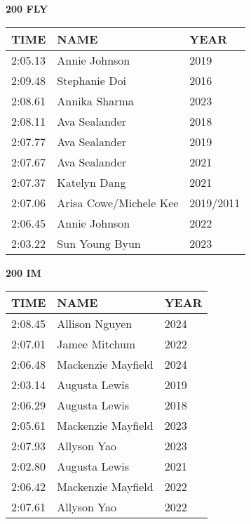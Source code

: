 \begin{minipage}[t]{0.48\textwidth}
\centering
\textbf{200 FLY}\\[0.05cm]
\begin{tabular}{@{}p{1.8cm}p{2.8cm}p{1.2cm}@{}}
\hline
\textbf{TIME} & \textbf{NAME} & \textbf{YEAR} \\
\hline
2:05.13 & Annie Johnson & 2019 \\
2:09.48 & Stephanie Doi & 2016 \\
2:08.61 & Annika Sharma & 2023 \\
2:08.11 & Ava Sealander & 2018 \\
2:07.77 & Ava Sealander & 2019 \\
2:07.67 & Ava Sealander & 2021 \\
2:07.37 & Katelyn Dang & 2021 \\
2:07.06 & Arisa Cowe/Michele Kee & 2019/2011 \\
2:06.45 & Annie Johnson & 2022 \\
2:03.22 & Sun Young Byun & 2023 \\
\hline
\end{tabular}
\end{minipage}\hfill
\begin{minipage}[t]{0.48\textwidth}
\centering
\textbf{200 IM}\\[0.05cm]
\begin{tabular}{@{}p{1.8cm}p{2.8cm}p{1.2cm}@{}}
\hline
\textbf{TIME} & \textbf{NAME} & \textbf{YEAR} \\
\hline
2:08.45 & Allison Nguyen & 2024 \\
2:07.01 & Jamee Mitchum & 2022 \\
2:06.48 & Mackenzie Mayfield & 2024 \\
2:03.14 & Augusta Lewis & 2019 \\
2:06.29 & Augusta Lewis & 2018 \\
2:05.61 & Mackenzie Mayfield & 2023 \\
2:07.93 & Allyson Yao & 2023 \\
2:02.80 & Augusta Lewis & 2021 \\
2:06.42 & Mackenzie Mayfield & 2022 \\
2:07.61 & Allyson Yao & 2022 \\
\hline
\end{tabular}
\end{minipage}

\vspace{0.4cm}

